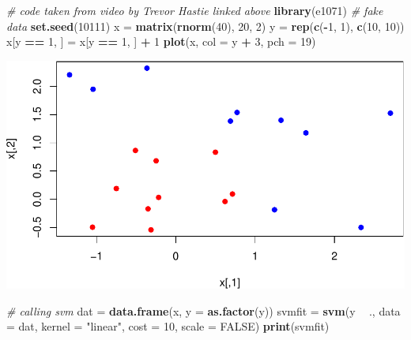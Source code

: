 \documentclass[]{article}
\newenvironment{Shaded}{\begin{snugshade}}{\end{snugshade}}
\newcommand{\CommentTok}[1]{\textcolor[rgb]{0.56,0.35,0.01}{\textit{#1}}}
\newcommand{\DataTypeTok}[1]{\textcolor[rgb]{0.13,0.29,0.53}{#1}}
\newcommand{\DecValTok}[1]{\textcolor[rgb]{0.00,0.00,0.81}{#1}}
\newcommand{\KeywordTok}[1]{\textcolor[rgb]{0.13,0.29,0.53}{\textbf{#1}}}
\newcommand{\NormalTok}[1]{#1}
\newcommand{\OperatorTok}[1]{\textcolor[rgb]{0.81,0.36,0.00}{\textbf{#1}}}
\newcommand{\OtherTok}[1]{\textcolor[rgb]{0.56,0.35,0.01}{#1}}
\newcommand{\StringTok}[1]{\textcolor[rgb]{0.31,0.60,0.02}{#1}}
\begin{document}
\begin{Shaded}
\begin{Highlighting}[]
\CommentTok{# code taken from video by Trevor Hastie linked above}
\KeywordTok{library}\NormalTok{(e1071)}
\CommentTok{# fake data}
\KeywordTok{set.seed}\NormalTok{(}\DecValTok{10111}\NormalTok{)}
\NormalTok{x =}\StringTok{ }\KeywordTok{matrix}\NormalTok{(}\KeywordTok{rnorm}\NormalTok{(}\DecValTok{40}\NormalTok{), }\DecValTok{20}\NormalTok{, }\DecValTok{2}\NormalTok{)}
\NormalTok{y =}\StringTok{ }\KeywordTok{rep}\NormalTok{(}\KeywordTok{c}\NormalTok{(}\OperatorTok{-}\DecValTok{1}\NormalTok{, }\DecValTok{1}\NormalTok{), }\KeywordTok{c}\NormalTok{(}\DecValTok{10}\NormalTok{, }\DecValTok{10}\NormalTok{))}
\NormalTok{x[y }\OperatorTok{==}\StringTok{ }\DecValTok{1}\NormalTok{, ] =}\StringTok{ }\NormalTok{x[y }\OperatorTok{==}\StringTok{ }\DecValTok{1}\NormalTok{, ] }\OperatorTok{+}\StringTok{ }\DecValTok{1}
\KeywordTok{plot}\NormalTok{(x, }\DataTypeTok{col =}\NormalTok{ y }\OperatorTok{+}\StringTok{ }\DecValTok{3}\NormalTok{, }\DataTypeTok{pch =} \DecValTok{19}\NormalTok{)}
\end{Highlighting}
\end{Shaded}

\includegraphics{9SVM_files/figure-latex/unnamed-chunk-28-1.pdf}

\begin{Shaded}
\begin{Highlighting}[]
\CommentTok{# calling svm}
\NormalTok{dat =}\StringTok{ }\KeywordTok{data.frame}\NormalTok{(x, }\DataTypeTok{y =} \KeywordTok{as.factor}\NormalTok{(y))}
\NormalTok{svmfit =}\StringTok{ }\KeywordTok{svm}\NormalTok{(y }\OperatorTok{~}\StringTok{ }\NormalTok{., }\DataTypeTok{data =}\NormalTok{ dat, }\DataTypeTok{kernel =} \StringTok{"linear"}\NormalTok{, }\DataTypeTok{cost =} \DecValTok{10}\NormalTok{, }\DataTypeTok{scale =} \OtherTok{FALSE}\NormalTok{)}
\KeywordTok{print}\NormalTok{(svmfit)}
\end{Highlighting}
\end{Shaded}
\end{document}
